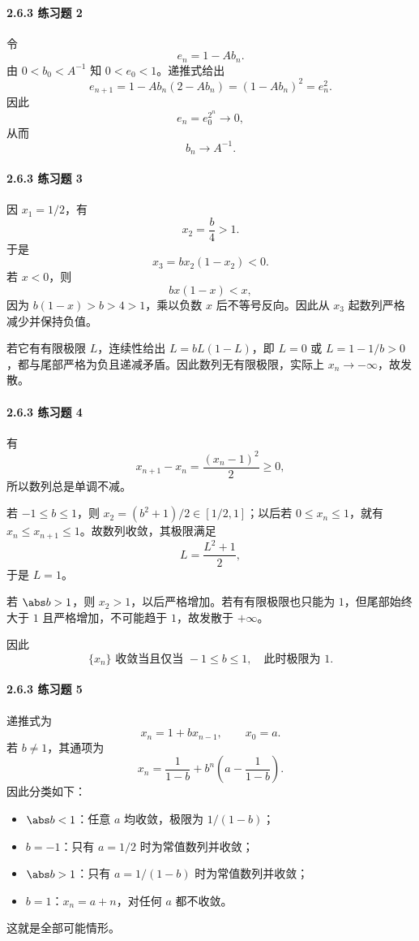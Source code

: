 \paragraph{2.6.3 练习题 2}
\begin{xsolution}
令
\[
  e_n=1-Ab_n.
\]
由 $0<b_0<A^{-1}$ 知 $0<e_0<1$。递推式给出
\[
  e_{n+1}=1-Ab_n(2-Ab_n)=(1-Ab_n)^2=e_n^2.
\]
因此
\[
  e_n=e_0^{2^n}\to0,
\]
从而
\[
  \boxed{b_n\to A^{-1}}.
\]
\end{xsolution}

\paragraph{2.6.3 练习题 3}
\begin{xsolution}
因 $x_1=1/2$，有
\[
  x_2=\frac b4>1.
\]
于是
\[
  x_3=bx_2(1-x_2)<0.
\]
若 $x<0$，则
\[
  bx(1-x)<x,
\]
因为 $b(1-x)>b>4>1$，乘以负数 $x$ 后不等号反向。因此从 $x_3$ 起数列严格减少并保持负值。

若它有有限极限 $L$，连续性给出 $L=bL(1-L)$，即 $L=0$ 或 $L=1-1/b>0$，都与尾部严格为负且递减矛盾。因此数列无有限极限，实际上 $x_n\to-\infty$，故发散。
\end{xsolution}

\paragraph{2.6.3 练习题 4}
\begin{xsolution}
有
\[
  x_{n+1}-x_n=\frac{(x_n-1)^2}{2}\ge0,
\]
所以数列总是单调不减。

若 $-1\le b\le1$，则 $x_2=(b^2+1)/2\in[1/2,1]$；以后若 $0\le x_n\le1$，就有 $x_n\le x_{n+1}\le1$。故数列收敛，其极限满足
\[
  L=\frac{L^2+1}{2},
\]
于是 $L=1$。

若 $\abs b>1$，则 $x_2>1$，以后严格增加。若有有限极限也只能为 $1$，但尾部始终大于 $1$ 且严格增加，不可能趋于 $1$，故发散于 $+\infty$。

因此
\[
  \boxed{\{x_n\}\text{ 收敛当且仅当 }-1\le b\le1,
  \quad\text{此时极限为 }1.}
\]
\end{xsolution}

\paragraph{2.6.3 练习题 5}
\begin{xsolution}
递推式为
\[
  x_n=1+bx_{n-1},\qquad x_0=a.
\]
若 $b\ne1$，其通项为
\[
  x_n=\frac1{1-b}+b^n\left(a-\frac1{1-b}\right).
\]
因此分类如下：
\begin{itemize}
  \item $\abs b<1$：任意 $a$ 均收敛，极限为 $1/(1-b)$；
  \item $b=-1$：只有 $a=1/2$ 时为常值数列并收敛；
  \item $\abs b>1$：只有 $a=1/(1-b)$ 时为常值数列并收敛；
  \item $b=1$：$x_n=a+n$，对任何 $a$ 都不收敛。
\end{itemize}
这就是全部可能情形。
\end{xsolution}

